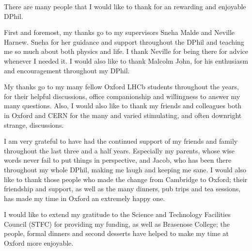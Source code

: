 
There are many people that I would like to thank for an rewarding and enjoyable DPhil.

First and foremost, my thanks go to my supervisors Sneha Malde and Neville Harnew. Sneha for her guidance and support throughout the DPhil and teaching me so much about both physics and life. I thank Neville for being there for advice whenever I needed it. I would also like to thank Malcolm John, for his enthusiasm and encouragement throughout my DPhil.

My thanks go to my many fellow Oxford LHCb students throughout the years, for their helpful discussions, office companionship and willingness to answer my many questions. Also, I would also like to thank my friends and colleagues both in Oxford and CERN for the many and varied stimulating, and often downright strange, discussions.

I am very grateful to have had the continued support of my friends and family throughout the last three and a half years. Especially my parents, whose wise words never fail to put things in perspective, and Jacob, who has been there throughout my whole DPhil, making me laugh and keeping me sane. I would also like to thank those people who made the change from Cambridge to Oxford; their friendship and support, as well as the many dinners, pub trips and tea sessions, has made my time in Oxford an extremely happy one.

I would like to extend my gratitude to the Science and Technology Facilities Council (STFC) for providing my funding, as well as Brasenose College; the people, formal dinners and second desserts have helped to make my time at Oxford more enjoyable.